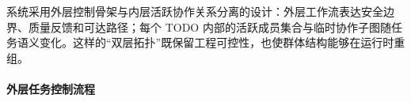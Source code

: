 系统采用外层控制骨架与内层活跃协作关系分离的设计：外层工作流表达安全边界、质量反馈和可达路径；每个 TODO 内部的活跃成员集合与临时协作子图随任务语义变化。这样的``双层拓扑''既保留工程可控性，也使群体结构能够在运行时重组。






\paragraph{外层任务控制流程}


